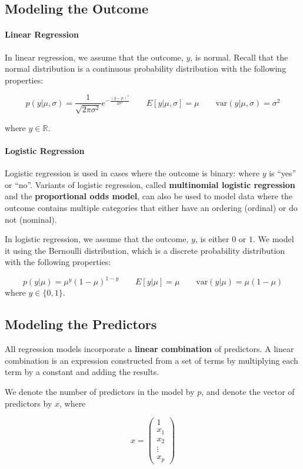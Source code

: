 \subsection{Modeling the Outcome}

\paragraph{Linear Regression} In linear regression, we assume that the outcome, $y$, is normal. Recall that the normal distribution is a continuous probability distribution with the following properties:

$$ p(y | \mu, \sigma) = \frac{1}{\sqrt{2 \pi \sigma^2}} e^{-\frac{(y-\mu)^2}{2 \sigma^2}} \qquad  E[y| \mu, \sigma] = \mu \qquad \text{var}(y | \mu, \sigma) = \sigma^2 $$

where $y \in \mathbb{R}$.

\paragraph{Logistic Regression} Logistic regression is used in cases where the outcome is binary: where $y$ is ``yes'' or ``no''. Variants of logistic regression, called \textbf{multinomial logistic regression} and the \textbf{proportional odds model}, can also be used to model data where the outcome contains multiple categories that either have an ordering (ordinal) or do not (nominal). 

In logistic regression, we assume that the outcome, $y$, is either $0$ or $1$. We model it using the Bernoulli distribution, which is a discrete probability distribution with the following properties:

$$ p(y|\mu) = \mu^y (1 - \mu) ^ {1-y} \qquad E[y| \mu] = \mu \qquad \text{var}(y | \mu) = \mu (1 - \mu) $$
where $y \in \{0, 1\}$.

\subsection{Modeling the Predictors}

All regression models incorporate a \textbf{linear combination} of predictors. A linear combination is an expression constructed from a set of terms by multiplying each term by a constant and adding the results.

We denote the number of predictors in the model by $p$, and denote the vector of predictors by $x$, where

$$ x = \begin{pmatrix}
1 \\
           x_{1} \\
           x_{2} \\
           \vdots \\
           x_{p}
         \end{pmatrix} $$
         
